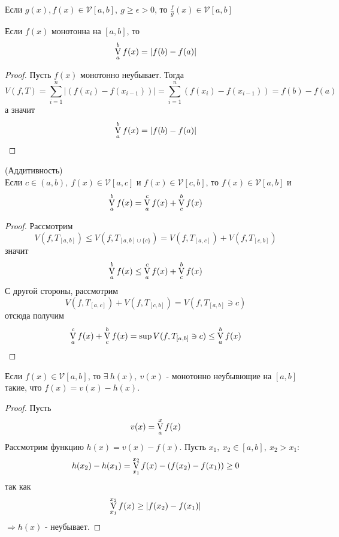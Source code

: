 \begin{consequense}
    Если $g(x), f(x)\in \mathcal{V}[a,b],\ g\geq \epsilon>0$, то $\frac{f}{g}(x)\in \mathcal{V}[a,b]$
\end{consequense} 
\begin{numtheorem}
    Если $f(x)$ монотонна на $[a,b]$, то
    \[\operatorname*{V}\limits_{a}^{b} f(x)=|f(b)- f(a)|\]
\end{numtheorem}
\begin{proof}
    Пусть $f(x)$ монотонно неубывает. Тогда
    \[V(f,T)=\sum\limits_{i=1}^{n}|(f(x_i)-f(x_{i-1}))|=\sum\limits_{i=1}^{n}(f(x_i)-f(x_{i-1}))=f(b)-f(a)\]
    а значит
    \[\operatorname*{V}\limits_{a}^{b}f(x)=|f(b)-f(a)|\]
\end{proof} 
\begin{numtheorem} (Аддитивность)\\
    Если $c\in (a,b),\ f(x)\in \mathcal{V}[a,c]$ и $f(x)\in \mathcal{V}[c, b]$, то $f(x)\in \mathcal{V}[a,b]$ и 
    \[\operatorname*{V}\limits_{a}^{b}f(x)=\operatorname*{V}\limits_{a}^{c}f(x)+\operatorname*{V}\limits_{c}^{b}f(x)\]
\end{numtheorem} 
\begin{proof}
    Рассмотрим 
    \[V(f,T_{[a,b]})\leq V(f, T_{[a,b]\cup \{c\}})=V(f, T_{[a,c]})+V(f,T_{[c,b]})\]
    значит
    \[\operatorname*{V}\limits_{a}^{b} f(x)\leq \operatorname*{V}\limits_{a}^{c} f(x)+\operatorname*{V}\limits_{c}^{b} f(x)\]
    С другой стороны, рассмотрим 
    \[V(f, T_{[a,c]})+V(f, T_{[c,b]})=V(f, T_{[a,b]}\ni c)\]
    отсюда получим
    \[\operatorname*{V}\limits_{a}^{c}f(x)+\operatorname*{V}\limits_{c}^{b}f(x)=\sup V(f,T_{[a,b]}\ni c)\leq \operatorname*{V}\limits_{a}^{b} f(x)\] 
\end{proof} 
\setcounter{thmcount}{0}
\begin{theorem}
    Если $f(x)\in \mathcal{V}[a,b]$, то $\exists\ h(x),\ v(x)$ - монотонно неубывющие на $[a,b]$ такие, что $f(x)=v(x)-h(x)$.
\end{theorem} 
\begin{proof}
    Пусть
    \[v(x)=\operatorname*{V}\limits_{a}^{x} f(x)\]
    Рассмотрим функцию $h(x)=v(x)-f(x)$. Пусть $x_1,\ x_2\in [a,b],\ x_2>x_1$:
    \[h(x_2)-h(x_1)=\operatorname*{V}\limits_{x_1}^{x_2}f(x)-(f(x_2)-f(x_1))\geq 0\]
    так как 
    \[\operatorname*{V}\limits_{x_1}^{x_2}f(x)\geq|f(x_2)-f(x_1)|\]
    $\Rightarrow h(x)$ - неубывает.
\end{proof} 
